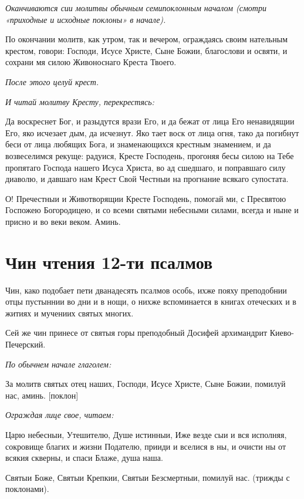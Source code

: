 \itshape Оканчиваются сии молитвы обычным семипоклонным началом (смотри «приходные и исходные поклоны» в начале).\normalfont{}


По окончании молитв, как утром, так и вечером, ограждаясь своим нательным крестом, говори: Господи, Исусе Христе, Сыне Божии, благослови и освяти, и сохрани мя силою Живоноснаго Креста Твоего.


\itshape После этого целуй крест.\normalfont{}


\itshape И читай молитву Кресту, перекрестясь:\normalfont{}


Да воскреснет Бог, и разыдутся врази Его, и да бежат от лица Его ненавидящии Его, яко исчезает дым, да исчезнут. Яко тает воск от лица огня, тако да погибнут беси от лица любящих Бога, и знаменающихся крестным знамением, и да возвеселимся рекуще: радуися, Кресте Господень, прогоняя бесы силою на Тебе пропятаго Господа нашего Исуса Христа, во ад сшедшаго, и поправшаго силу диаволю, и давшаго нам Крест Свой Честныи на прогнание всякаго супостата.


О! Пречестныи и Животворящии Кресте Господень, помогай ми, с Пресвятою Госпожею Богородицею, и со всеми святыми небесными силами, всегда и ныне и присно и во веки веком. Аминь.




\section{Чин чтения 12-ти псалмов}
 


Чин, како подобает пети дванадесять псалмов особь, ихже пояху преподобнии отцы пустыннии во дни и в нощи, о нихже вспоминается в книгах отеческих и в житиях и мучениих святых многих.


Сей же чин принесе от святыя горы преподобный Досифей архимандрит Киево-Печерский.


\itshape По обычнем начале глаголем:\normalfont{}


За молитв святых отец наших, Господи, Исусе Христе, Сыне Божии, помилуй нас, аминь. [поклон]


\itshape Ограждая лице свое, читаем:\normalfont{}


Царю небесныи, Утешителю, Душе истинныи, Иже везде сыи и вся исполняя, сокровище благих и жизни Подателю, прииди и вселися в ны, и очисти ны от всякия скверны, и спаси Блаже, душа наша.


Святыи Боже, Святыи Крепкии, Святыи Безсмертныи, помилуй нас. (трижды с поклонами).


